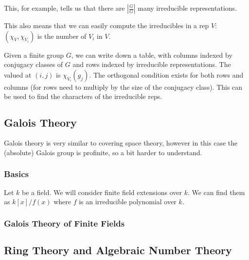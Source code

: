 \documentclass[main.tex]{subfiles}
\begin{document}
This, for example, tells us that there are $|\frac{G}{G}|$ many irreducible representations.

This also means that we can easily compute the irreducibles in a rep $V$: $(\chi_V, \chi_{V_i})$ is the number of $V_i$ in $V$.

Given a finite group $G$, we can write down a table, with columns indexed by conjugacy classes of $G$ and rows indexed by irreducible representations. The valued at $(i,j)$ is $\chi_{V_i}(g_j)$. The orthogonal condition exists for both rows and columns (for rows need to multiply by the size of the conjugacy class). This can be used to find the characters of the irreducible reps.




\subsection{Galois Theory}

Galois theory is very similar to covering space theory, however in this case the (absolute) Galois group is profinite, so a bit harder to understand. 

\subsubsection{Basics}
Let $k$ be a field. We will consider finite field extensions over $k$. We can find them as $k[x]/f(x)$ where $f$ is an irreducible polynomial over $k$. 

\begin{definition}

\end{definition}





\subsubsection{Galois Theory of Finite Fields}



\subsection{Ring Theory and Algebraic Number Theory}
\end{document}
